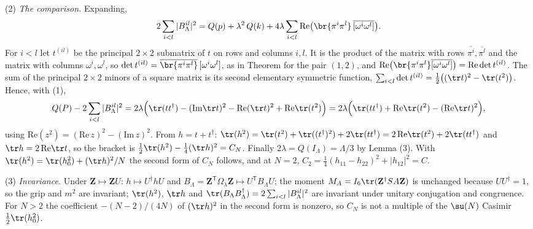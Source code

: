 (2) \emph{The comparison.} Expanding,
\[
2\sum_{i<l}|B^{il}_{\Lambda}|^{2} = Q(p) + \lambda^{2}\,Q(k) + 4\lambda\sum_{i<l}\mathrm{Re}\bigl(\br{\pi^{i}\pi^{l}}\,\overline{[\omega^{i}\omega^{l}]}\bigr).
\]
For $i < l$ let $t^{(il)}$ be the principal $2\times 2$ submatrix of $t$ on rows and columns $i, l$. It is the product of the matrix with rows $\overline{\pi^{i}}, \overline{\pi^{l}}$ and the matrix with columns $\omega^{i}, \omega^{l}$, so $\det t^{(il)} = \overline{\br{\pi^{i}\pi^{l}}}\,[\omega^{i}\omega^{l}]$, as in Theorem  for the pair $(1,2)$, and $\mathrm{Re}\bigl(\br{\pi^{i}\pi^{l}}\overline{[\omega^{i}\omega^{l}]}\bigr) = \mathrm{Re}\det t^{(il)}$. The sum of the principal $2\times 2$ minors of a square matrix is its second elementary symmetric function, $\sum_{i<l}\det t^{(il)} = \tfrac12\bigl((\tr t)^{2} - \tr(t^{2})\bigr)$. Hence, with (1),
\[
Q(P) - 2\sum_{i<l}|B^{il}_{\Lambda}|^{2} = 2\lambda\Bigl(\tr(tt^{\dagger}) - (\mathrm{Im}\tr t)^{2} - \mathrm{Re}(\tr t)^{2} + \mathrm{Re}\tr(t^{2})\Bigr) = 2\lambda\Bigl(\tr(tt^{\dagger}) + \mathrm{Re}\tr(t^{2}) - (\mathrm{Re}\tr t)^{2}\Bigr),
\]
using $\mathrm{Re}(z^{2}) = (\mathrm{Re}\,z)^{2} - (\mathrm{Im}\,z)^{2}$. From $h = t + t^{\dagger}$: $\tr(h^{2}) = \tr(t^{2}) + \tr((t^{\dagger})^{2}) + 2\tr(tt^{\dagger}) = 2\,\mathrm{Re}\tr(t^{2}) + 2\tr(tt^{\dagger})$ and $\tr h = 2\,\mathrm{Re}\tr t$, so the bracket is $\tfrac12\tr(h^{2}) - \tfrac14(\tr h)^{2} = C_{N}$. Finally $2\lambda = Q(I_{\Lambda}) = \Lambda/3$ by Lemma (3). With $\tr(h^{2}) = \tr(h_{0}^{2}) + (\tr h)^{2}/N$ the second form of $C_{N}$ follows, and at $N = 2$, $C_{2} = \tfrac14(h_{11} - h_{22})^{2} + |h_{12}|^{2} = C$.

(3) \emph{Invariance.} Under $\mathbf{Z} \mapsto \mathbf{Z}U$: $h \mapsto U^{\dagger}hU$ and $B_{\Lambda} = \mathbf{Z}^{\mathsf T}\Omega_{\lambda}\mathbf{Z} \mapsto U^{\mathsf T}B_{\Lambda}U$; the moment $M_{A} = I_{6}\tr(\mathbf{Z}^{\dagger}SA\mathbf{Z})$ is unchanged because $UU^{\dagger} = 1$, so the grip and $m^{2}$ are invariant; $\tr(h^{2})$, $\tr h$ and $\tr(B_{\Lambda}B_{\Lambda}^{\dagger}) = 2\sum_{i<l}|B^{il}_{\Lambda}|^{2}$ are invariant under unitary conjugation and congruence. For $N > 2$ the coefficient $-(N-2)/(4N)$ of $(\tr h)^{2}$ in the second form is nonzero, so $C_{N}$ is not a multiple of the $\su(N)$ Casimir $\tfrac12\tr(h_{0}^{2})$.

